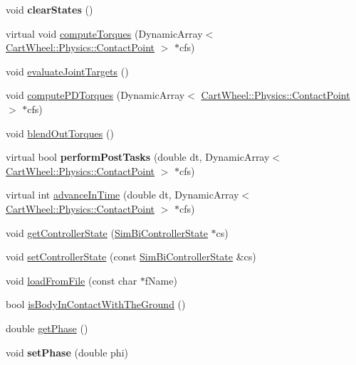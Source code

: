 \begin{DoxyCompactItemize}
\item 
\hypertarget{classCartWheel_1_1Core_1_1SimBiController_ad88fd2b7ae9f85538824dd6751b6669e}{
void {\bfseries clearStates} ()}
\label{classCartWheel_1_1Core_1_1SimBiController_ad88fd2b7ae9f85538824dd6751b6669e}

\item 
virtual void \hyperlink{classCartWheel_1_1Core_1_1SimBiController_aa6510698f1e27b154ace8e9459080322}{computeTorques} (DynamicArray$<$ \hyperlink{classCartWheel_1_1Physics_1_1ContactPoint}{CartWheel::Physics::ContactPoint} $>$ $\ast$cfs)
\item 
void \hyperlink{classCartWheel_1_1Core_1_1SimBiController_acd7efab03c0deed76d8576d00c04e3fb}{evaluateJointTargets} ()
\item 
void \hyperlink{classCartWheel_1_1Core_1_1SimBiController_ab519befed4078f3b3f6d32a01e8dd4f8}{computePDTorques} (DynamicArray$<$ \hyperlink{classCartWheel_1_1Physics_1_1ContactPoint}{CartWheel::Physics::ContactPoint} $>$ $\ast$cfs)
\item 
void \hyperlink{classCartWheel_1_1Core_1_1SimBiController_ad14b3ef705af33ee75b66a6af11729ed}{blendOutTorques} ()
\item 
\hypertarget{classCartWheel_1_1Core_1_1SimBiController_a6147d543d72c21b2dd9995c49d67dfb8}{
virtual bool {\bfseries performPostTasks} (double dt, DynamicArray$<$ \hyperlink{classCartWheel_1_1Physics_1_1ContactPoint}{CartWheel::Physics::ContactPoint} $>$ $\ast$cfs)}
\label{classCartWheel_1_1Core_1_1SimBiController_a6147d543d72c21b2dd9995c49d67dfb8}

\item 
virtual int \hyperlink{classCartWheel_1_1Core_1_1SimBiController_a8289b2b2b785da4aa537fbd2fd39da51}{advanceInTime} (double dt, DynamicArray$<$ \hyperlink{classCartWheel_1_1Physics_1_1ContactPoint}{CartWheel::Physics::ContactPoint} $>$ $\ast$cfs)
\item 
void \hyperlink{classCartWheel_1_1Core_1_1SimBiController_a529c02585e22b1c824b32eb6255de87a}{getControllerState} (\hyperlink{structCartWheel_1_1Core_1_1SimBiControllerState}{SimBiControllerState} $\ast$cs)
\item 
void \hyperlink{classCartWheel_1_1Core_1_1SimBiController_afcc2d6d9f5478bba116554d81fe561b9}{setControllerState} (const \hyperlink{structCartWheel_1_1Core_1_1SimBiControllerState}{SimBiControllerState} \&cs)
\item 
void \hyperlink{classCartWheel_1_1Core_1_1SimBiController_a2c146c079a03b0f5799d4780f5c8ff43}{loadFromFile} (const char $\ast$fName)
\item 
bool \hyperlink{classCartWheel_1_1Core_1_1SimBiController_abb6c500d0bde2d3e015109a050cc3b9a}{isBodyInContactWithTheGround} ()
\item 
double \hyperlink{classCartWheel_1_1Core_1_1SimBiController_a861b41caaff2de4a485707865557c6b4}{getPhase} ()
\item 
\hypertarget{classCartWheel_1_1Core_1_1SimBiController_acca122180d68927b6676ea8c8ec908e5}{
void {\bfseries setPhase} (double phi)}
\label{classCartWheel_1_1Core_1_1SimBiController_acca122180d68927b6676ea8c8ec908e5}


\end{DoxyCompactItemize}
